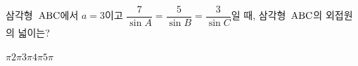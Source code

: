 삼각형~$\mathrm{ABC}$에서 $a=3$이고 $\dfrac{7}{\sin A}=\dfrac{5}{\sin B}=\dfrac{3}{\sin C}$일 때, 삼각형~$\mathrm{ABC}$의 외접원의 넓이는?
\begin{choices32}{$\pi$}{$2\pi$}{$3\pi$}{$4\pi$}{$5\pi$}\end{choices32}

